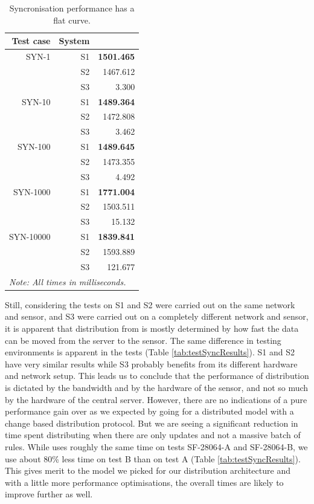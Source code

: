 \renewcommand{\arraystretch}{1.5}
\begin{table}[h]
  \centering
  \begin{tabular}{r|r|r}
	Test case & System & \bhtb{} \\
\hline
SYN-1 & S1 & \textbf{1501.465} \\
 & S2 & 1467.612 \\
 & S3 & 3.300 \\
\hline
SYN-10 & S1 & \textbf{1489.364} \\
 & S2 & 1472.808 \\
 & S3 & 3.462 \\
\hline
SYN-100 & S1 & \textbf{1489.645} \\
 & S2 & 1473.355 \\
 & S3 & 4.492 \\
\hline
SYN-1000 & S1 & \textbf{1771.004} \\
 & S2 & 1503.511 \\
 & S3 & 15.132 \\
\hline
SYN-10000 & S1 & \textbf{1839.841} \\
 & S2 & 1593.889 \\
 & S3 & 121.677 \\
	\hline
	\multicolumn{3}{l}{\textit{Note: All times in milliseconds.}}
  \end{tabular}
  \caption{\bhtb{} Syncronisation performance has a flat curve.}
  \label{tab:bhtbtSyncResults}
\end{table}

Still, considering the tests on S1 and S2 were carried out on the same network
and sensor, and S3 were carried out on a completely different network and
sensor, it is apparent that distribution from \bhtb{} is mostly determined by
how fast the data can be moved from the server to the sensor.  The same
difference in testing environments is apparent in the \snowman{} tests (Table
\ref{tab:testSyncResults}).
S1 and S2 have very similar results while S3 probably benefits from its
different hardware and network setup. This leads us to conclude that the
performance of distribution is dictated by the bandwidth and by the hardware of
the sensor, and not so much by the hardware of the central server. However,
there are no indications of a pure performance gain over \bhtb{} as we expected
by going for a distributed model with a change based distribution protocol. But
we are seeing a significant reduction in time spent distributing when there are
only updates and not a massive batch of rules. While \bhtb{} uses roughly the
same time on tests SF-28064-A and SF-28064-B, we use about 80\% less time on
test B than on test A (Table \ref{tab:testSyncResults}). This gives merit to the
model we picked for our distribution architecture and with a little more
performance optimisations, the overall times are likely to improve further as
well.

